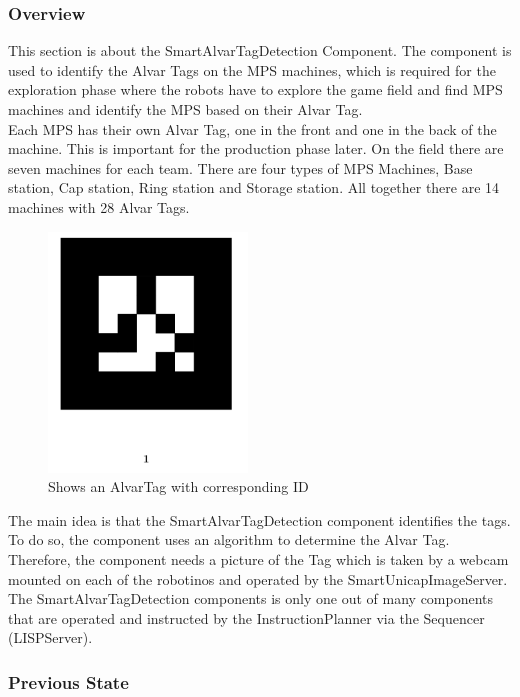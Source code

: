  \subsubsection{Overview}


This section is about the SmartAlvarTagDetection Component. The component is used to identify the Alvar Tags on the MPS machines, which is required for the exploration phase where the robots have to explore the game field and find MPS machines and identify the MPS based on their Alvar Tag. \\
Each MPS has their own Alvar Tag, one in the front and one in the back of the machine. This is important for the production phase later. On the field there are seven machines for each team. There are four types of MPS Machines, Base station, Cap station, Ring station and Storage station. All together there are 14 machines with 28 Alvar Tags. \\

\begin{figure}[h]
\centering
\includegraphics[scale=0.75]{pic/numberedMarker.png}
\caption{Shows an AlvarTag with corresponding ID}
\label{fig:smartAlvarFlow}
\end{figure}

The main idea is that the SmartAlvarTagDetection component identifies the tags. To do so, the component uses an algorithm to determine the Alvar Tag. Therefore, the component needs a picture of the Tag which is taken by a webcam mounted on each of the robotinos and operated by the SmartUnicapImageServer. The SmartAlvarTagDetection components is only one out of many components that are operated and instructed by the InstructionPlanner via the Sequencer (LISPServer). \\


\subsubsection{Previous State}

